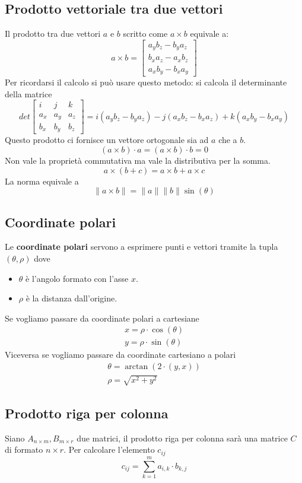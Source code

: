 \subsection{Prodotto vettoriale tra due vettori}
Il prodotto tra due vettori $a$ e $b$ scritto come $a \times b$ equivale a:
\[
	a \times b = \begin{bmatrix}
		a_y b_z - b_y a_z \\ b_x a_z - a_x b_z \\ a_x b_y - b_x a_y
	\end{bmatrix}
\]
Per ricordarsi il calcolo si pu\`o usare questo metodo: si calcola il determinante della
matrice
\[
	det \begin{bmatrix}
		i   & j   & k   \\
		a_x & a_y & a_z \\
		b_x & b_y & b_z
	\end{bmatrix} =
	i(a_y b_z - b_y a_z) - j(a_x b_z - b_x a_z) + k(a_x b_y - b_x a_y)
\]
Questo prodotto ci fornisce un vettore ortogonale sia ad $a$ che a $b$.
\[ (a \times b) \cdot a = (a \times b ) \cdot b = 0 \]
Non vale la propriet\`a commutativa ma vale la distributiva per la somma.
\[ a \times (b + c) = a \times b + a \times c \]
La norma equivale a
\[ \| a \times b \| = \| a \| \| b \| \sin(\theta) \]

\subsection{Coordinate polari}
Le \textbf{coordinate polari} servono a esprimere punti e vettori tramite la tupla
$(\theta, \rho)$ dove
\begin{itemize}
	\item $\theta$ \`e l'angolo formato con l'asse $x$.
	\item $\rho$ \`e la distanza dall'origine.
\end{itemize}
Se vogliamo passare da coordinate polari a cartesiane
\begin{gather*}
	x = \rho \cdot \cos(\theta) \\
	y = \rho \cdot \sin(\theta)
\end{gather*}
Viceversa se vogliamo passare da coordinate cartesiano a polari
\begin{gather*}
	\theta = \arctan(2 \cdot (y, x)) \\
	\rho = \sqrt{x^2 + y^2}
\end{gather*}

\subsection{Prodotto riga per colonna}
Siano $A_{n \times m}, B_{m \times r}$ due matrici, il prodotto riga per colonna
sar\`a una matrice $C$ di formato $n \times r$. Per calcolare l'elemento $c_{ij}$
\[ c_{ij} = \sum_{k = 1}^m a_{i,k} \cdot b_{k,j} \]

